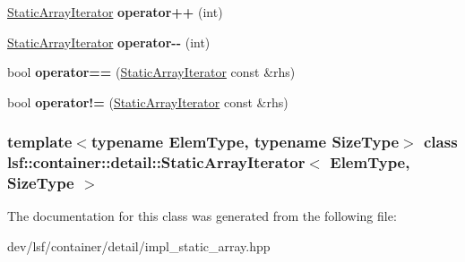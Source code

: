 \begin{DoxyCompactItemize}
\item 
\hypertarget{classlsf_1_1container_1_1detail_1_1StaticArrayIterator_acecb86bbd3c497adccc068c209249a2f}{
\hyperlink{classlsf_1_1container_1_1detail_1_1StaticArrayIterator}{StaticArrayIterator} {\bfseries operator++} (int)}
\label{classlsf_1_1container_1_1detail_1_1StaticArrayIterator_acecb86bbd3c497adccc068c209249a2f}

\item 
\hypertarget{classlsf_1_1container_1_1detail_1_1StaticArrayIterator_a32efca3861b16209d7494d910d539347}{
\hyperlink{classlsf_1_1container_1_1detail_1_1StaticArrayIterator}{StaticArrayIterator} {\bfseries operator-\/-\/} (int)}
\label{classlsf_1_1container_1_1detail_1_1StaticArrayIterator_a32efca3861b16209d7494d910d539347}

\item 
\hypertarget{classlsf_1_1container_1_1detail_1_1StaticArrayIterator_a5a4b4f28b8e409326790ce7b72d47a87}{
bool {\bfseries operator==} (\hyperlink{classlsf_1_1container_1_1detail_1_1StaticArrayIterator}{StaticArrayIterator} const \&rhs)}
\label{classlsf_1_1container_1_1detail_1_1StaticArrayIterator_a5a4b4f28b8e409326790ce7b72d47a87}

\item 
\hypertarget{classlsf_1_1container_1_1detail_1_1StaticArrayIterator_a96f8936227726ee17422afc0feb0128c}{
bool {\bfseries operator!=} (\hyperlink{classlsf_1_1container_1_1detail_1_1StaticArrayIterator}{StaticArrayIterator} const \&rhs)}
\label{classlsf_1_1container_1_1detail_1_1StaticArrayIterator_a96f8936227726ee17422afc0feb0128c}

\end{DoxyCompactItemize}
\subsubsection*{template$<$typename ElemType, typename SizeType$>$ class lsf::container::detail::StaticArrayIterator$<$ ElemType, SizeType $>$}



The documentation for this class was generated from the following file:\begin{DoxyCompactItemize}
\item 
dev/lsf/container/detail/impl\_\-static\_\-array.hpp\end{DoxyCompactItemize}
